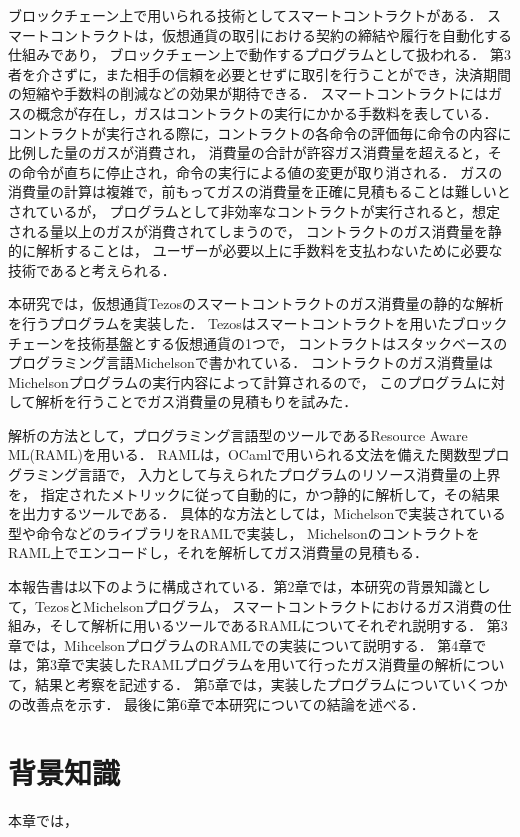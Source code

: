 \documentclass{kuisthesis}
\begin{document}
ブロックチェーン上で用いられる技術としてスマートコントラクトがある．
スマートコントラクトは，仮想通貨の取引における契約の締結や履行を自動化する仕組みであり，
ブロックチェーン上で動作するプログラムとして扱われる．
第3者を介さずに，また相手の信頼を必要とせずに取引を行うことができ，決済期間の短縮や手数料の削減などの効果が期待できる．
スマートコントラクトにはガスの概念が存在し，ガスはコントラクトの実行にかかる手数料を表している．
コントラクトが実行される際に，コントラクトの各命令の評価毎に命令の内容に比例した量のガスが消費され，
消費量の合計が許容ガス消費量を超えると，その命令が直ちに停止され，命令の実行による値の変更が取り消される．
ガスの消費量の計算は複雑で，前もってガスの消費量を正確に見積もることは難しいとされているが，
プログラムとして非効率なコントラクトが実行されると，想定される量以上のガスが消費されてしまうので，
コントラクトのガス消費量を静的に解析することは，
ユーザーが必要以上に手数料を支払わないために必要な技術であると考えられる．

本研究では，仮想通貨Tezosのスマートコントラクトのガス消費量の静的な解析を行うプログラムを実装した．
Tezosはスマートコントラクトを用いたブロックチェーンを技術基盤とする仮想通貨の1つで，
コントラクトはスタックベースのプログラミング言語Michelsonで書かれている．
コントラクトのガス消費量はMichelsonプログラムの実行内容によって計算されるので，
このプログラムに対して解析を行うことでガス消費量の見積もりを試みた．

解析の方法として，プログラミング言語型のツールであるResource Aware ML(RAML)を用いる．
RAMLは，OCamlで用いられる文法を備えた関数型プログラミング言語で，
入力として与えられたプログラムのリソース消費量の上界を，
指定されたメトリックに従って自動的に，かつ静的に解析して，その結果を出力するツールである．
具体的な方法としては，Michelsonで実装されている型や命令などのライブラリをRAMLで実装し，
MichelsonのコントラクトをRAML上でエンコードし，それを解析してガス消費量の見積もる．

本報告書は以下のように構成されている．第2章では，本研究の背景知識として，TezosとMichelsonプログラム，
スマートコントラクトにおけるガス消費の仕組み，そして解析に用いるツールであるRAMLについてそれぞれ説明する．
第3章では，MihcelsonプログラムのRAMLでの実装について説明する．
第4章では，第3章で実装したRAMLプログラムを用いて行ったガス消費量の解析について，結果と考察を記述する．
第5章では，実装したプログラムについていくつかの改善点を示す．
最後に第6章で本研究についての結論を述べる．


\section{背景知識}\label{sec-preliminary}
本章では，
\end{document}
